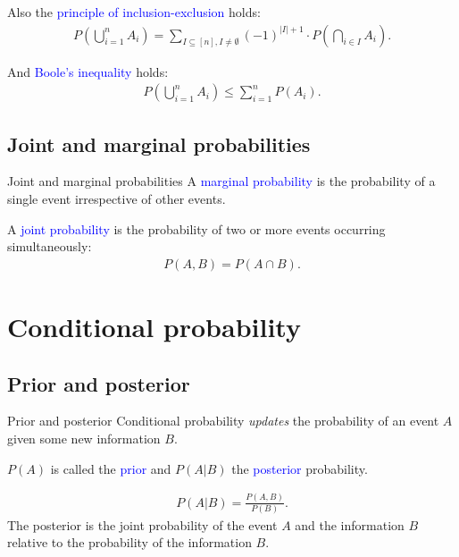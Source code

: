 \documentclass{beamer}
\def\padding{\vspace{0.5cm}}
\def\spadding{\vspace{0.25cm}}
\def\b{\textcolor{blue}}
\begin{document}
\begin{frame}
    Also the \b{principle of inclusion-exclusion} holds:
    \begin{align*}
        P(\bigcup_{i=1}^n A_i) = \sum_{I \subseteq [n], I \neq \emptyset} (-1)^{|I| + 1} \cdot P(\bigcap_{i \in I} A_i).
    \end{align*}\pause\par\padding
    And \b{Boole's inequality} holds:
    \begin{align*}
        P(\bigcup_{i=1}^n A_i) \leq \sum_{i=1}^n P(A_i).
    \end{align*}
\end{frame}

\subsection{Joint and marginal probabilities}
\begin{frame}{Joint and marginal probabilities}
    A \b{marginal probability} is the probability of a single event irrespective of other events.\pause\par\spadding
    A \b{joint probability} is the probability of two or more events occurring simultaneously:
    \begin{align*}
        P(A,B) = P(A \cap B).
    \end{align*}
\end{frame}

\section{Conditional probability}
\subsection{Prior and posterior}
\begin{frame}{Prior and posterior}
    Conditional probability \textit{updates} the probability of an event $A$ given some new information $B$.\pause\par\padding
    $P(A)$ is called the \b{prior} and $P(A|B)$ the \b{posterior} probability.\pause\par\padding
    \begin{align*}
        P(A|B) = \frac{P(A,B)}{P(B)}.
    \end{align*}
    The posterior is the joint probability of the event $A$ and the information $B$ relative to the probability of the information $B$.
\end{frame}
\end{document}
